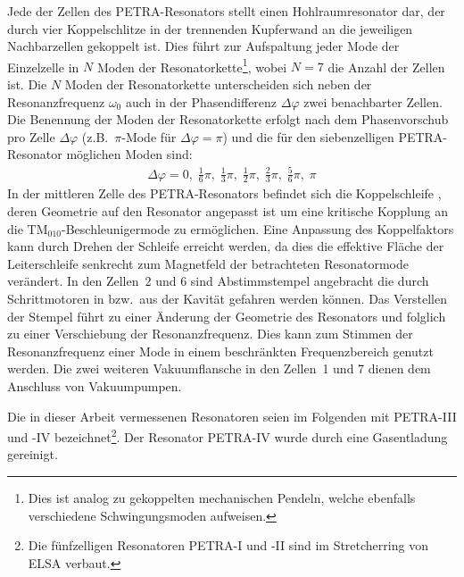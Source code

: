 Jede der Zellen des PETRA-Resonators stellt einen Hohlraumresonator dar, der durch vier Koppelschlitze in der trennenden Kupferwand an die jeweiligen Nachbarzellen gekoppelt ist.
Dies führt zur Aufspaltung jeder Mode der Einzelzelle in $N$ Moden der Resonatorkette\footnote{Dies ist analog zu gekoppelten mechanischen Pendeln, welche ebenfalls verschiedene Schwingungsmoden aufweisen.}, wobei $N = 7$ die Anzahl der Zellen ist.
Die $N$ Moden der Resonatorkette unterscheiden sich neben der Resonanzfrequenz $\omega_0$ auch in der Phasendifferenz $\Delta \varphi$ zwei benachbarter Zellen.
Die Benennung der Moden der Resonatorkette erfolgt nach dem Phasenvorschub pro Zelle $\Delta \varphi$ (z.B.\ $\pi$-Mode für $\Delta \varphi = \pi$) und die für den siebenzelligen PETRA-Resonator möglichen Moden sind:
\begin{align}
  \Delta \varphi = 0,\; \frac{1}{6} \pi,\; \frac{1}{3} \pi,\; \frac{1}{2} \pi,\; \frac{2}{3} \pi,\; \frac{5}{6} \pi,\; \pi
\end{align}
In der mittleren Zelle des PETRA-Resonators befindet sich die Koppelschleife \cite{desy_schleife}, deren Geometrie auf den Resonator angepasst ist um eine kritische Kopplung an die $\mathrm{TM}_{010}$-Beschleuniger\-mode zu ermöglichen.
Eine Anpassung des Koppelfaktors kann durch Drehen der Schleife erreicht werden, da dies die effektive Fläche der Leiterschleife senkrecht zum Magnetfeld der betrachteten Resonatormode verändert.
In den Zellen~2 und 6 sind Abstimmstempel \cite{desy_stempel} angebracht die durch Schrittmotoren in bzw.\ aus der Kavität gefahren werden können.
Das Verstellen der Stempel führt zu einer Änderung der Geometrie des Resonators und folglich zu einer Verschiebung der Resonanzfrequenz.
Dies kann zum Stimmen der Resonanzfrequenz einer Mode in einem beschränkten Frequenzbereich genutzt werden.
Die zwei weiteren Vakuumflansche in den Zellen~1 und 7 dienen dem Anschluss von Vakuumpumpen.


Die in dieser Arbeit vermessenen Resonatoren seien im Folgenden mit PETRA-III und -IV bezeichnet\footnote{Die fünfzelligen Resonatoren PETRA-I und -II sind im Stretcherring von ELSA verbaut.}. Der Resonator PETRA-IV wurde durch eine Gasentladung gereinigt.

